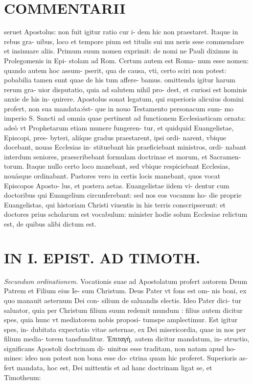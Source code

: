 \documentclass{article}
\begin{document}
\begin{pages}
\section*{COMMENTARII }\pstart seruet Apostolus: non fuit igitur ratio cur i- dem hic non praestaret. Itaque in rebus gra- uibus, loco et tempore pium est titulis sui mu neris sese commendare et insinuare aliis.  \pend\pstart Primum suum nomen exprimit: de nomi ne Pauli diximus in Prolegomenis in Epi- stolam ad Rom. Certum autem est Roma- num esse nomen: quando autem hoc assum- pserit, qua de causa, vti, certo sciri non potest: pobabilia tamen sunt quae de his tum affere- bamus. omittenda igitur harum rerum gra- uior disputatio, quia ad salutem nihil pro- dest, et curiosi est hominis anxie de his in- quirere.  \pend\pstart Apostolus sonat legatum, qui superioris alicuius domini profert, non sua mandata:ést- que in nouo Testamento personacum sum- mo imperio S. Sancti ad omnia quae pertinent ad functionem Ecclesiasticam ornata: adeò vt Prophetarum etiam munere fungeren- tur, et quidquid Euangelistae, Episcopi, pres- byteri, aliíque gradus praestarent, ipsi ordi- narent, vbique docebant, nouas Ecclesias in- stituebant his praeficiebant ministros, ordi- nabant interdum seniores, praescribebant formulam doctrinae et morum, et Sacramen- torum. Itaque nullo certo loco manebant, sed vbique respiciebant Ecclesias, nouásque ordinabant. Pastores vero in certis locis  \pend\pstart manebant, quos vocat Episcopos Aposto- lus, et postera aetas. Euangelistae iidem vi- dentur cum doctoribus qui Euangelium circunferebant: sed nos eos vocamus ho- die proprie Euangelistas, qui historiam Christi viuentis in his terris conscripserunt: et doctores prius scholarum est vocabulum: minister hodie solum Ecclesiae relictum est, de quibus alibi dictum est.  \pend
\section*{IN I. EPIST. AD TIMOTH. }
\textit{Secundum ordinationem. }\pstart Vocationis suae ad Apostolatum profert autorem Deum Patrem et Filium eius Ie- sum Christum. Deus Pater vt fons est om- nis boni, ex quo manauit aeternum Dei con- silium de saluandis electis. Ideo Pater dici- tur saluator, quia per Christum filium suum redemit mundum : filius autem dicitur spes, quia hunc vt mediatorem nobis proposi- tumspe amplectimur. Est igitur spes, in- dubitata expectatio vitae aeternae, ex Dei misericordia, quae in nos per filium media- torem tansfunditur.  \pend
\marginpar{[ p.11 ]}\pstart Ἐπιταγὴ, autem dicitur mandatum, in- structio, significans Apostoli doctrinam di- uinitus esse traditam, non natam apud ho- mines: ideo non potest non bona esse do- ctrina quam hic proferet. Superioris as- fert mandata, hoc est, Dei mittentis et ad hanc doctrinam ligat se, et Timotheum:  \pend

\end{pages}
\end{document}
